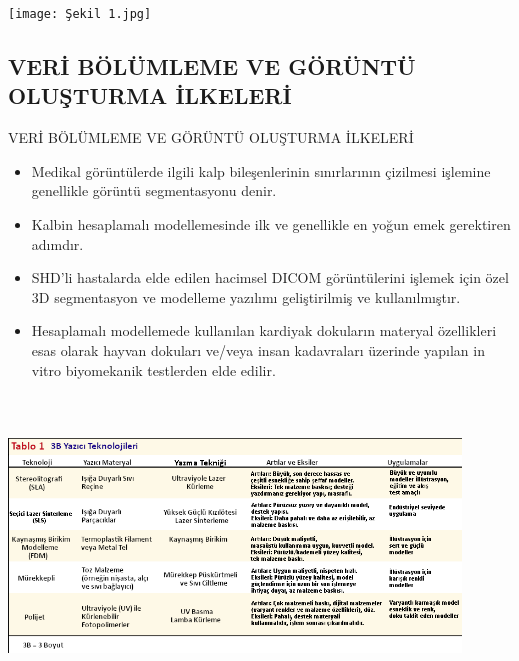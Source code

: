 \documentclass{beamer}
\begin{document}
\begin{frame}{}
\begin{block}{}
\texttt{[image: Şekil 1.jpg]}
\end{block}
\end{frame}

\subsection{VERİ BÖLÜMLEME VE GÖRÜNTÜ OLUŞTURMA İLKELERİ}

\begin{frame}{VERİ BÖLÜMLEME VE GÖRÜNTÜ OLUŞTURMA İLKELERİ}

\begin{itemize}
    \item Medikal görüntülerde ilgili kalp bileşenlerinin sınırlarının çizilmesi işlemine genellikle görüntü segmentasyonu denir. 
    \item Kalbin hesaplamalı modellemesinde ilk ve genellikle en yoğun emek gerektiren adımdır. 
    \item SHD'li hastalarda elde edilen hacimsel DICOM görüntülerini işlemek için özel 3D segmentasyon ve modelleme yazılımı geliştirilmiş ve kullanılmıştır. 
    \item Hesaplamalı modellemede kullanılan kardiyak dokuların materyal özellikleri esas olarak hayvan dokuları ve/veya insan kadavraları üzerinde yapılan in vitro biyomekanik testlerden elde edilir. 
\end{itemize}

\end{frame}

\begin{frame}{}
\begin{block}{}
\includegraphics[width=12cm,height=8cm]{Tablo 1.png}
\end{block}
\end{frame}
\end{document}

